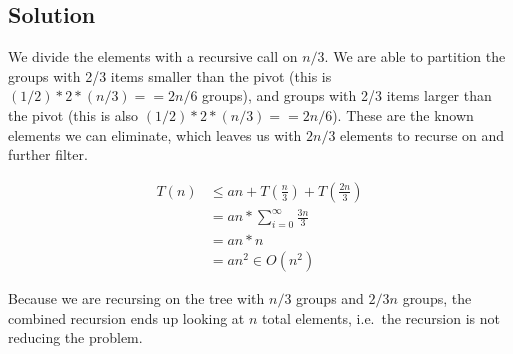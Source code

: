 \subsection*{Solution}

We divide the elements with a recursive call on $n/3$. We are able to partition the groups with 2/3 items smaller than the pivot (this is $(1/2)*2*(n/3) == 2n/6$ groups), and groups with 2/3 items larger than the pivot (this is also $(1/2)*2*(n/3) == 2n/6$). These are the known elements we can eliminate, which leaves us with $2n/3$ elements to recurse on and further filter. 

\begin{align*}
T(n) &\leq an + T(\frac{n}{3}) + T(\frac{2n}{3}) \\
     &= an * \sum_{i=0}^{\infty} \frac{3n}{3} \\
     &= an * n \\
     &= an^{2} \in O(n^{2})
\end{align*}

Because we are recursing on the tree with $n/3$ groups and $2/3n$ groups, the combined recursion ends up looking at $n$ total elements, i.e.\ the recursion is not reducing the problem.
